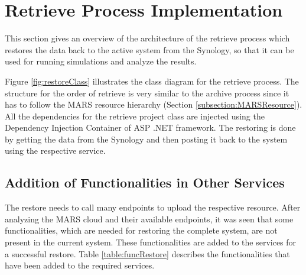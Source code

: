 \section{Retrieve Process Implementation}
This section gives an overview of the architecture of the retrieve process which restores the data back to the active
system from the Synology, so that it can be used for running simulations and analyze the results. 

Figure \ref{fig:restoreClass} illustrates the class diagram for the retrieve process. The structure for the order of retrieve is very similar to the archive process
since it has to follow the MARS resource hierarchy (Section \ref{subsection:MARSResource}). All the dependencies for the retrieve project class are injected
using the Dependency Injection Container of ASP .NET framework. The restoring is done by getting the data from the Synology and then posting it back to the system
using the respective service.

\subsection{Addition of Functionalities in Other Services}
The restore needs to call many endpoints to upload the respective resource. After analyzing the MARS cloud and their available endpoints, it was
seen that some functionalities, which are needed for restoring the complete system, are not present in the current system. These functionalities are
added to the services for a successful restore. Table \ref{table:funcRestore} describes the functionalities that have been
added to the required services.

